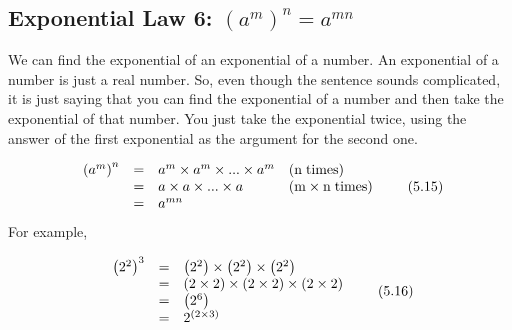            \subsection{ Exponential Law 6: ${\left({a}^{m}\right)}^{n}={a}^{mn}$}
            \nopagebreak
        \label{m38359*id66531}We can find the exponential of an exponential of a number. An exponential of a number is just a real number. So, even though the sentence sounds complicated, it is just saying that you can find the exponential of a number and then take the exponential of that number. You just take the exponential twice, using the answer of the first exponential as the argument for the second one.\par 
        \label{m38359*uid35}\nopagebreak\noindent{}
    \begin{equation}
    \begin{array}{cccc}\hfill {\left({a}^{m}\right)}^{n}& =& {a}^{m}\ensuremath{\times}{a}^{m}\ensuremath{\times}...\ensuremath{\times}{a}^{m}\hfill & \left(\mathrm{n\; times}\right)\hfill \\ \hfill & =& a\ensuremath{\times}a\ensuremath{\times}...\ensuremath{\times}a\hfill & \left(\mathrm{m}\ensuremath{\times}\mathrm{n\; times}\right)\hfill \\ \hfill & =& {a}^{mn}\hfill & \end{array}\tag{5.15}
      \end{equation}
        \label{m38359*id66694}For example,\par 
        \label{m38359*id66697}\nopagebreak\noindent{}
          
    \begin{equation}
    \begin{array}{ccc}\hfill {\left({2}^{2}\right)}^{3}& =& \left({2}^{2}\right)\ensuremath{\times}\left({2}^{2}\right)\ensuremath{\times}\left({2}^{2}\right)\hfill \\ & =& \left(2\ensuremath{\times}2\right)\ensuremath{\times}\left(2\ensuremath{\times}2\right)\ensuremath{\times}\left(2\ensuremath{\times}2\right)\hfill \\ & =& \left({2}^{6}\right)\hfill \\ & =& {2}^{\left(2\ensuremath{\times}3\right)}\hfill \end{array}\tag{5.16}
      \end{equation}
\label{m38359*secfhsst!!!underscore!!!id1894}

